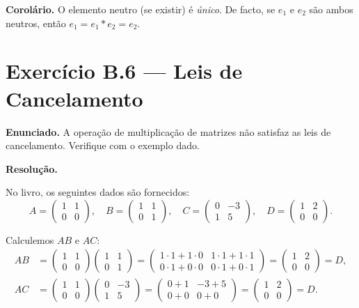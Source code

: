 \documentclass[12pt,a4paper]{article}
\begin{document}
\medskip
\noindent\textbf{Corolário.} O elemento neutro (se existir) é \emph{único}. De facto,
se $e_1$ e $e_2$ são ambos neutros, então $e_1 = e_1 * e_2 = e_2$.

\section*{Exercício B.6 — Leis de Cancelamento}

\textbf{Enunciado.} A operação de multiplicação de matrizes não satisfaz as leis de
cancelamento. Verifique com o exemplo dado.

\medskip
\textbf{Resolução.}

No livro, os seguintes dados são fornecidos:
\[
  A = \begin{pmatrix} 1 & 1 \\ 0 & 0 \end{pmatrix}, \quad
  B = \begin{pmatrix} 1 & 1 \\ 0 & 1 \end{pmatrix}, \quad
  C = \begin{pmatrix} 0 & -3 \\ 1 & 5 \end{pmatrix}, \quad
  D = \begin{pmatrix} 1 & 2 \\ 0 & 0 \end{pmatrix}.
\]

Calculemos $AB$ e $AC$:
\begin{align*}
  AB &= \begin{pmatrix}1&1\\0&0\end{pmatrix}\begin{pmatrix}1&1\\0&1\end{pmatrix}
       = \begin{pmatrix}1\cdot1+1\cdot0 & 1\cdot1+1\cdot1\\
                        0\cdot1+0\cdot0 & 0\cdot1+0\cdot1\end{pmatrix}
       = \begin{pmatrix}1&2\\0&0\end{pmatrix} = D,\\[6pt]
  AC &= \begin{pmatrix}1&1\\0&0\end{pmatrix}\begin{pmatrix}0&-3\\1&5\end{pmatrix}
       = \begin{pmatrix}0+1 & -3+5\\0+0 & 0+0\end{pmatrix}
       = \begin{pmatrix}1&2\\0&0\end{pmatrix} = D.
\end{align*}
\end{document}
